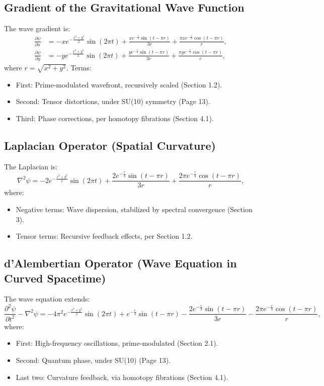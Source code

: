 \documentclass{article}
\theoremstyle{plain}
\begin{document}
\subsection{Gradient of the Gravitational Wave Function}
The wave gradient is:
\begin{align}
\frac{\partial \psi}{\partial x} &= - x e^{-\frac{x^2 + y^2}{2}} \sin(2\pi t) + \frac{x e^{-\frac{r}{3}} \sin(t - \pi r)}{3r} + \frac{\pi x e^{-\frac{r}{3}} \cos(t - \pi r)}{r}, \\
\frac{\partial \psi}{\partial y} &= - y e^{-\frac{x^2 + y^2}{2}} \sin(2\pi t) + \frac{y e^{-\frac{r}{3}} \sin(t - \pi r)}{3r} + \frac{\pi y e^{-\frac{r}{3}} \cos(t - \pi r)}{r},
\end{align}
where \( r = \sqrt{x^2 + y^2} \). Terms:
\begin{itemize}
    \item First: Prime-modulated wavefront, recursively scaled (Section 1.2).
    \item Second: Tensor distortions, under SU(10) symmetry (Page 13).
    \item Third: Phase corrections, per homotopy fibrations (Section 4.1).
\end{itemize}

\subsection{Laplacian Operator (Spatial Curvature)}
The Laplacian is:
\begin{equation}
\nabla^2 \psi = -2 e^{-\frac{x^2 + y^2}{2}} \sin(2\pi t) + \frac{2 e^{-\frac{r}{3}} \sin(t - \pi r)}{3r} + \frac{2 \pi e^{-\frac{r}{3}} \cos(t - \pi r)}{r},
\end{equation}
where:
\begin{itemize}
    \item Negative terms: Wave dispersion, stabilized by spectral convergence (Section 3).
    \item Tensor terms: Recursive feedback effects, per Section 1.2.
\end{itemize}

\subsection{d'Alembertian Operator (Wave Equation in Curved Spacetime)}
The wave equation extends:
\begin{equation}
\frac{\partial^2 \psi}{\partial t^2} - \nabla^2 \psi = -4 \pi^2 e^{-\frac{x^2 + y^2}{2}} \sin(2\pi t) + e^{-\frac{r}{3}} \sin(t - \pi r) - \frac{2 e^{-\frac{r}{3}} \sin(t - \pi r)}{3r} - \frac{2 \pi e^{-\frac{r}{3}} \cos(t - \pi r)}{r},
\end{equation}
where:
\begin{itemize}
    \item First: High-frequency oscillations, prime-modulated (Section 2.1).
    \item Second: Quantum phase, under SU(10) (Page 13).
    \item Last two: Curvature feedback, via homotopy fibrations (Section 4.1).
\end{itemize}
\end{document}
